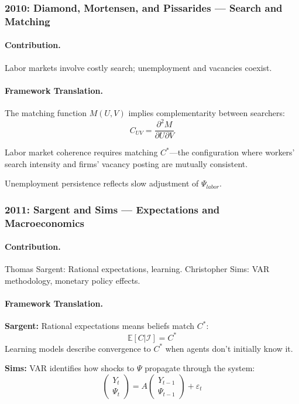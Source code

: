 \subsubsection{2010: Diamond, Mortensen, and Pissarides --- Search and Matching}

\paragraph{Contribution.}
Labor markets involve costly search; unemployment and vacancies coexist.

\paragraph{Framework Translation.}
The matching function $M(U, V)$ implies complementarity between searchers:
\begin{equation}
  C_{UV} = \frac{\partial^2 M}{\partial U \partial V}
\end{equation}

Labor market coherence requires matching $C^*$---the configuration where
workers' search intensity and firms' vacancy posting are mutually consistent.

Unemployment persistence reflects slow adjustment of $\Psi_{labor}$.

\subsubsection{2011: Sargent and Sims --- Expectations and Macroeconomics}

\paragraph{Contribution.}
Thomas Sargent: Rational expectations, learning.
Christopher Sims: VAR methodology, monetary policy effects.

\paragraph{Framework Translation.}
\textbf{Sargent:} Rational expectations means beliefs match $C^*$:
\begin{equation}
  \mathbb{E}[C | \mathcal{I}] = C^*
\end{equation}
Learning models describe convergence to $C^*$ when agents don't initially know it.

\textbf{Sims:} VAR identifies how shocks to $\Psi$ propagate through the system:
\begin{equation}
  \begin{pmatrix} Y_t \\ \Psi_t \end{pmatrix} = A \begin{pmatrix} Y_{t-1} \\ \Psi_{t-1} \end{pmatrix} + \varepsilon_t
\end{equation}

